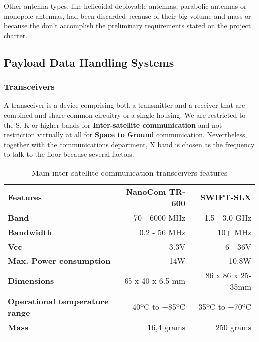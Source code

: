 Other antenna types, like helicoidal deployable antennas, parabolic antennas or monopole antennas, had been discarded because of their big volume and mass or because the don't accomplish the preliminary requirements stated on the project charter.  

\subsection{Payload Data Handling Systems}
\subsubsection{Transceivers}

A transceiver is a device comprising both a transmitter and a receiver that are combined and share common circuitry or a single housing. We are restricted to the S, K or higher bands for \textbf{Inter-satellite communication} and not restriction virtually at all for \textbf{Space to Ground} communication. Nevertheless, together with the communications department, X band is chosen as the frequency to talk to the floor because several factors.

\pagebreak
\begin{longtable}{| l | r | r |}
	
	\hline
	\rowcolor[gray]{0.60} \multicolumn{3}{|c|}{\textbf{Transceivers options - Inter-satellite comm.(S band)}} \\
	\hline
	
	\hline
	\rowcolor[gray]{0.75}	\textbf{Features} &  \textbf{NanoCom TR-600} & \textbf{SWIFT-SLX} \\
	\hline
	
	\cellcolor[gray]{0.85} \textbf{Band} & 70 - 6000 MHz  & 1.5 - 3.0 GHz\\
	\cellcolor[gray]{0.85} \textbf{Bandwidth} & 0.2 - 56 MHz& 10+ MHz\\
	\cellcolor[gray]{0.85} \textbf{Vcc} & 3.3V&6 - 36V \\
	\cellcolor[gray]{0.85} \textbf{Max. Power consumption} & 14W& 10.8W\\
	\cellcolor[gray]{0.85} \textbf{Dimensions} & 65 x 40 x 6.5 mm & 86 x 86 x 25-35mm\\
	\cellcolor[gray]{0.85} \textbf{Operational temperature range} & -40ºC to +85ºC & -35ºC to +70ºC\\
	\cellcolor[gray]{0.85} \textbf{Mass} & 16,4 grams&250 grams \\
	\hline
	
	\caption{Main inter-satellite communication transceivers features}
	\label{TransceiversSband}
	
\end{longtable}

